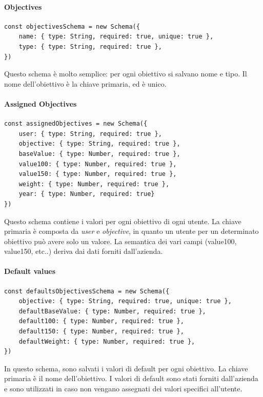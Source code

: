\paragraph{Objectives}

\begin{verbatim}
const objectivesSchema = new Schema({
    name: { type: String, required: true, unique: true },
    type: { type: String, required: true },
})
\end{verbatim}

Questo schema è molto semplice: per ogni obiettivo si salvano nome e tipo. Il nome dell'obiettivo è la 
chiave primaria, ed è unico.

\paragraph{Assigned Objectives}

\begin{verbatim}
const assignedObjectives = new Schema({
    user: { type: String, required: true },
    objective: { type: String, required: true },
    baseValue: { type: Number, required: true },
    value100: { type: Number, required: true },
    value150: { type: Number, required: true },
    weight: { type: Number, required: true },
    year: { type: Number, required: true}
})
\end{verbatim}

Questo schema contiene i valori per ogni obiettivo di ogni utente.
La chiave primaria è composta da \textit{user} e \textit{objective}, in quanto un utente per un determinato 
obiettivo può avere solo un valore. La semantica dei vari campi (value100, value150, etc..) deriva dai dati
forniti dall'azienda.

\paragraph{Default values}

\begin{verbatim}
const defaultsObjectivesSchema = new Schema({
    objective: { type: String, required: true, unique: true },
    defaultBaseValue: { type: Number, required: true },
    default100: { type: Number, required: true },
    default150: { type: Number, required: true },
    defaultWeight: { type: Number, required: true },
})
\end{verbatim}

In questo schema, sono salvati i valori di default per ogni obiettivo. La chiave primaria è il nome dell'obiettivo.
I valori di default sono stati forniti dall'azienda e sono utilizzati in caso non vengano assegnati dei valori 
specifici all'utente.

